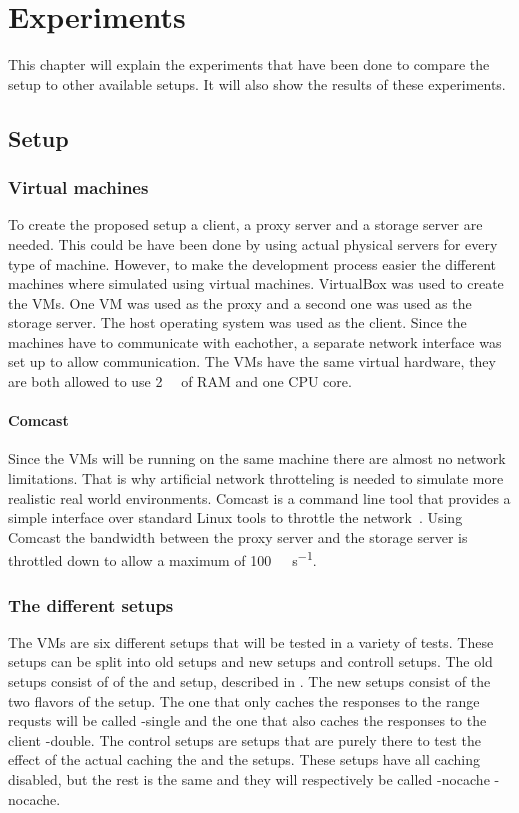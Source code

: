 \documentclass[twoside,openright]{uva-bachelor-thesis}
\begin{document}
\chapter{Experiments}
This chapter will explain the experiments that have been done to compare the
\lt setup to other available setups. It will also show the results of these
experiments.

\section{Setup}

\subsection{Virtual machines}
To create the proposed setup a client, a proxy server and a storage server are
needed. This could be have been done by using actual physical servers for every
type of machine. However, to make the development process easier the different
machines where simulated using virtual machines. VirtualBox was used to create
the VMs. One VM was used as the proxy and a second one was used as the storage
server. The host operating system was used as the client. Since the machines
have to communicate with eachother, a separate network interface was set up to
allow communication. The VMs have the same virtual hardware, they are both
allowed to use \SI{2}{\giga\byte} of RAM and one CPU core.

\subsubsection{Comcast}
Since the VMs will be running on the same machine there are almost no network
limitations. That is why artificial network throtteling is needed to simulate
more realistic real world environments. Comcast is a command line tool that
provides a simple interface over standard Linux tools to throttle the
network~\autocite{comcast}. Using Comcast the bandwidth between the proxy server
and the storage server is throttled down to allow a maximum of
\SI[per-mode=symbol]{100}{\mega\bit\per\second}.


\subsection{The different setups}
The VMs are six different setups that will be tested in a variety of tests.
These setups can be split into old setups and new setups and controll setups.
The old setups consist of of the \cdn and \ipp setup, described in
. The new setups consist of the two flavors of the \lt
setup. The one that only caches the responses to the range requsts will be
called \lt-single and the one that also caches the responses to the client
\lt-double. The control setups are setups that are purely there to test the
effect of the actual caching the \lt and the \cdn setups. These setups have all
caching disabled, but the rest is the same and they will respectively be called
\lt-nocache \cdn-nocache.
\end{document}
